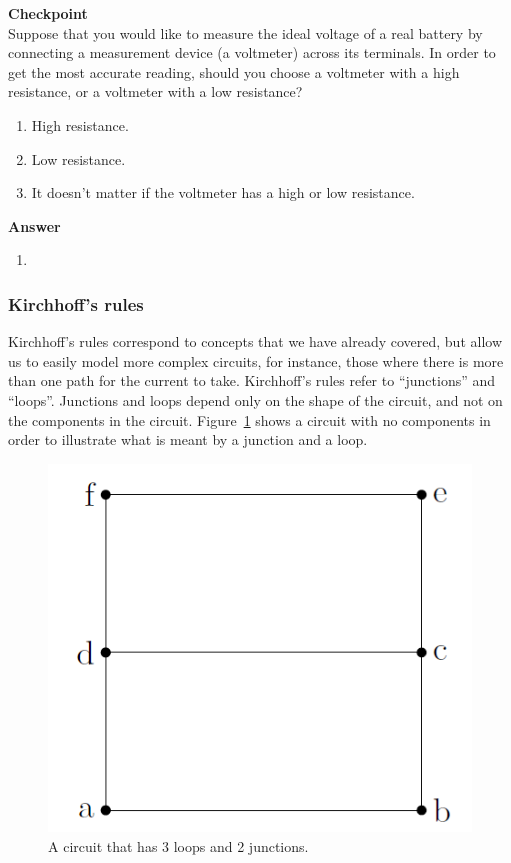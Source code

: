 \begin{framed}
\textbf{Checkpoint}\\
Suppose that you would like to measure the ideal voltage of a real battery by connecting a measurement device (a voltmeter) across its terminals. In order to get the most accurate reading, should you choose a voltmeter with a high resistance, or a voltmeter with a low resistance?

\begin{enumerate}
\item High resistance.
\item Low resistance.
\item It doesn't matter if the voltmeter has a high or low resistance.
\end{enumerate}

\begin{framed}
\textbf{Answer}\\
\begin{enumerate}
\item
\end{enumerate}
\end{framed}
\end{framed}

\subsubsection{Kirchhoff's rules}

Kirchhoff's rules correspond to concepts that we have already covered, but allow us to easily model more complex circuits, for instance, those where there is more than one path for the current to take. Kirchhoff's rules refer to ``junctions'' and ``loops''. Junctions and loops depend only on the shape of the circuit, and not on the components in the circuit. Figure~\ref{fig:circuits:3loopempty} shows a circuit with no components in order to illustrate what is meant by a junction and a loop.

\begin{figure}[!htbp]
\centering
\includegraphics[width=0.4\linewidth]{files/3loopempty-0e9cf961ed755afb96b62a98e97680bd.png}
\caption[]{A circuit that has 3 loops and 2 junctions.}
\label{fig:circuits:3loopempty}
\end{figure}

